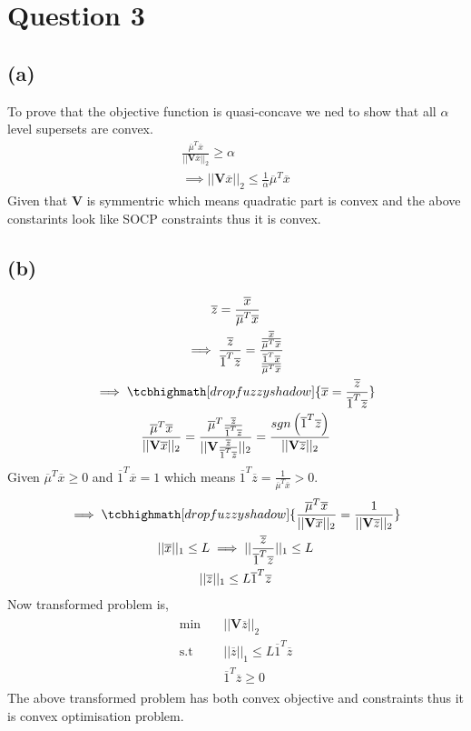 \documentclass{article}
\begin{document}
\section*{\hfil Question 3}
\subsection*{(a)}
To prove that the objective function is quasi-concave we ned to show that all $\alpha$ level supersets are convex.
	\begin{gather*}
		\frac{\overline{\mu}^T\overline{x}}{||\mathbf{V}\overline{x}||_2} \ge \alpha\\
		\implies ||\mathbf{V}\overline{x}||_2 \le \frac{1}{\alpha}\overline{\mu}^T\overline{x}
	\end{gather*}
	Given that $\mathbf{V}$ is symmentric which means quadratic part is convex and the above constarints look like SOCP constraints thus it is convex.
\subsection*{(b)}
\begin{gather*}
	\overline{z} = \frac{\overline{x}}{\overline{\mu}^T\overline{x}}\\\implies
	\frac{\overline{z}}{\overline{1}^T\overline{z}} = \frac{\frac{\overline{x}}{\overline{\mu}^T\overline{x}}}{\frac{\overline{1}^T\overline{x}}{\overline{\mu}^T\overline{x}}}\\
	\implies \tcbhighmath[drop fuzzy shadow]{\overline{x} = \frac{\overline{z}}{\overline{1}^T\overline{z}}}\\
	\frac{\overline{\mu}^T\overline{x}}{||\mathbf{V}\overline{x}||_2} = \frac{\overline{\mu}^T\frac{\overline{z}}{\overline{1}^T\overline{z}}}{||\mathbf{V}\frac{\overline{z}}{\overline{1}^T\overline{z}}||_2} = \frac{sgn\left(\overline{1}^T\overline{z}\right)}{||\mathbf{V}\overline{z}||_2}
\end{gather*}
Given $\overline{\mu}^T\overline{x} \ge 0$ and $\overline{1}^T\overline{x} = 1$ which means $\overline{1}^T\overline{z} = \frac{1}{\overline{\mu}^T\overline{x}} > 0$.
\begin{gather*}
	\implies \tcbhighmath[drop fuzzy shadow]{\frac{\overline{\mu}^T\overline{x}}{||\mathbf{V}\overline{x}||_2} = \frac{1}{||\mathbf{V}\overline{z}||_2}}\\
	||\overline{x}||_1 \le L \implies ||\frac{\overline{z}}{\overline{1}^T\overline{z}}||_1 \le L\\
	{||\overline{z}||_1} \le L{\overline{1}^T\overline{z}}
\end{gather*}
Now transformed problem is,
\begin{gather*}
	\begin{aligned}
		\min \quad & ||\mathbf{V}\overline{z}||_2\\
		\textrm{s.t} \quad & {||\overline{z}||_1} \le L{\overline{1}^T\overline{z}}\\
		& \overline{1}^T\overline{z} \ge 0
	\end{aligned}
\end{gather*}
The above transformed problem has both convex objective and constraints thus it is convex optimisation problem.
\end{document}
